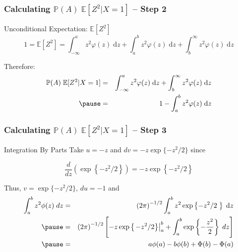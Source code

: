 \begin{frame}
  \frametitle{Calculating $\mathbb{P}(A)\; \mathbb{E}[Z^2|X=1]$ -- Step 2}
  \begin{block}{Unconditional Expectation: $\mathbb{E}[Z^2]$}
    \[
      1 = \mathbb{E}[Z^2]  = 
      \int_{-\infty}^a z^2 \varphi(z)\; \text{d}z +
      \int_{a}^b z^2 \varphi(z)\; \text{d}z +
      \int_{b}^\infty z^2 \varphi(z)\; \text{d}z
    \]
  \end{block}

  \pause

  \begin{block}{Therefore:}
    \begin{eqnarray*}
      \mathbb{P}(A)\; \mathbb{E}[Z^2|X=1] &=&  \int_{-\infty}^a z^2 \varphi(z)\; \text{d}z + \int_{b}^\infty z^2 \varphi(z)\; \text{d}z\\\pause 
       &=& 1 - \int_a^b z^2 \varphi(z)\; \text{d}z
    \end{eqnarray*}
  \end{block}
\end{frame}
\begin{frame}
  \frametitle{Calculating $\mathbb{P}(A)\;\mathbb{E}[Z^2|X=1]$ -- Step 3}

  \vspace{1em}

  \begin{block}{Integration By Parts}
  \small 
Take $u = -z$ and $dv = -z \exp\{-z^2/2\}$ since

	$$\frac{d}{dz} \left(\exp\left\{-z^2/2\right\}\right) = -z\exp\left\{-z^2/2\right\}$$

  \vspace{0.5em}

  \pause

Thus, $v = \exp\{-z^2/2\}$, $du = -1$ and 
\begin{eqnarray*}
  \int_a^b z^2 \phi(z) \; dz &=& \left( 2\pi \right)^{-1/2} \int_a^b z^2 \exp\left\{-z^2/2 \; \right\} \;\text{d}z\\ \pause
  &=& \left( 2\pi \right)^{-1/2}\left[-z \exp\left\{ \left.-z^2/2\right\}\right|_a^b+ \int_a^b \exp\left\{-\frac{z^2}{2}\right\}  \; dz \right]\\ \pause
		&=& a\phi(a) - b\phi(b) + \Phi(b) - \Phi(a)
\end{eqnarray*}
  \end{block}
\end{frame}
